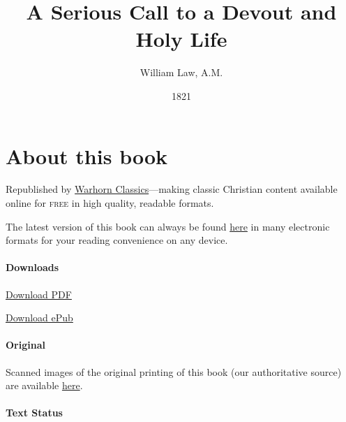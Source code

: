\documentclass[
]{book}
\title{A Serious Call to a Devout and Holy Life}
\author{William Law, A.M.}
\date{1821}
\begin{document}
\maketitle

\mainmatter
{}

{
\setcounter{tocdepth}{1}
\tableofcontents
}
\hypertarget{about-this-book}{%
\chapter*{About this book}\label{about-this-book}}

Republished by \href{https://classics.warhornmedia.com/}{Warhorn Classics}---making classic Christian content available online for \textsc{free} in high quality, readable formats.

The latest version of this book can always be found \href{https://warhornmedia.github.io/law-serious-call/}{here} in many electronic formats for your reading convenience on any device.

\hypertarget{downloads}{%
\subsubsection*{Downloads}\label{downloads}}

\href{https://warhornmedia.github.io/law-serious-call//Law-A_Serious_Call_To_A_Devout_And_Holy_Life.pdf}{Download PDF}

\href{https://warhornmedia.github.io/law-serious-call//Law-A_Serious_Call_To_A_Devout_And_Holy_Life.epub}{Download ePub}

\hypertarget{original}{%
\subsubsection*{Original}\label{original}}

Scanned images of the original printing of this book (our authoritative source) are available \href{https://archive.org/details/aseriouscalltoa00unkngoog}{here}.

\hypertarget{text-status}{%
\subsubsection*{Text Status}\label{text-status}}
\end{document}
